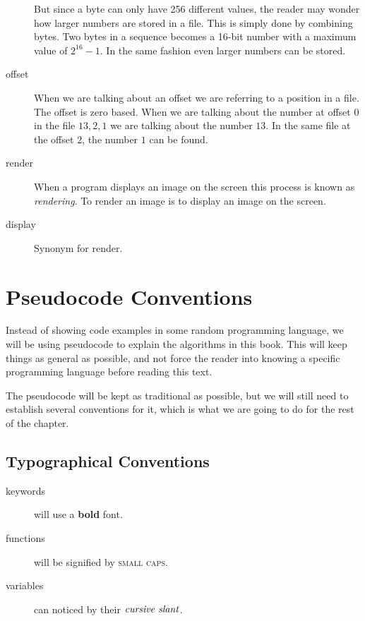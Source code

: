 \begin{description}
  But since a byte can only have 256 different values, the reader may
  wonder how larger numbers are stored in a file. This is simply done
  by combining bytes. Two bytes in a sequence becomes a 16-bit number
  with a maximum value of $2^{16} - 1$. In the same fashion even
  larger numbers can be stored.

\item[offset] When we are talking about an offset we are referring to
  a position in a file. The offset is zero based. When we are talking
  about the number at offset 0 in the file $13,2,1$ we are talking
  about the number $13$. In the same file at the offset $2$, the
  number $1$ can be found.


\item[render] When a program displays an image on the screen this
  process is known as \textit{rendering}. To render an image is to
  display an image on the screen.

\item[display] Synonym for render.

\end{description}

\section{Pseudocode Conventions}

Instead of showing code examples in some random programming language,
we will be using pseudocode to explain the algorithms in this book. This
will keep things as general as possible, and not force the reader into
knowing a specific programming language before reading this text.

The pseudocode will be kept as traditional as possible, but we will
still need to establish several conventions for it, which is what
we are going to do for the rest of the chapter.

\subsection{Typographical Conventions}

\begin{description}
\item[keywords] will use a \textbf{bold} font.
\item[functions] will be signified by \textsc{small caps}.
\item[variables] can noticed by their $\var{cursive\ slant}$.
\end{description}

